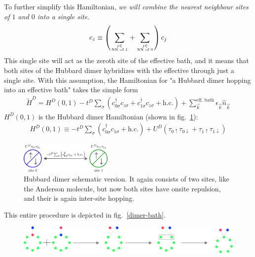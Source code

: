 \documentclass[10pt]{report}
\numberwithin{equation}{section}
\begin{document}
{ To further simplify this Hamiltonian, \textit{we will combine the nearest neighbour sites of \(1\) and \(0\) into a single site}.
 \begin{equation}\begin{aligned}
 	c_z \equiv \left(\sum_{j \in \atop{\text{NN of 1}}} + \sum_{j \in \atop{\text{NN of 0}}}\right)c_{j}
 \end{aligned}\end{equation}
 This single site will act as the zeroth site of the effective bath, and it means that both sites of the Hubbard dimer hybridizes with the effective through just a single site. With this assumption, the Hamiltonian for "a Hubbard dimer hopping into an effective bath" takes the simple form
 \begin{equation}\begin{aligned}
 	\label{dimer_p_bat}
 	\tilde H^D = H^D(0,1) - t^D \sum_{\sigma}\left(c^\dagger_{0\sigma}c_{z\sigma} + c^\dagger_{1\sigma}c_{z\sigma} + \text{h.c.}\right) + \sum_{\vec k}^\text{eff. bath}\epsilon_{\vec k}\hat n_{\vec k}
 \end{aligned}\end{equation}
 \(H^D(0,1)\) is the Hubbard dimer Hamiltonian (shown in fig.~\ref{hubb-dim}):
 \begin{equation}\begin{aligned}
 	\label{dimer_ham}
 	H^D(0,1) \equiv -t^D\sum_\sigma\left( c^\dagger_{0\sigma}c_{1\sigma} + \text{h.c.} \right) + U^D\left( \tau_{0 \uparrow}\tau_{0 \downarrow} + \tau_{1 \uparrow}\tau_{1 \downarrow}\right)
 \end{aligned}\end{equation}
 \begin{figure}[htpb!]
 	\centering
 	\includegraphics[width=0.4\textwidth]{../figures/hubb_dim.png}
 	\caption{Hubbard dimer schematic version. It again consists of two sites, like the Anderson molecule, but now both sites have onsite repulsion, and their is again inter-site hopping.}
 	\label{hubb-dim}
 \end{figure}
 This entire procedure is depicted in fig.~\ref{dimer-bath}.
 \begin{figure}[htpb]
 	\centering
 	\includegraphics[width=\textwidth]{../figures/dimer_bath.pdf}

\end{figure}}
\end{document}
